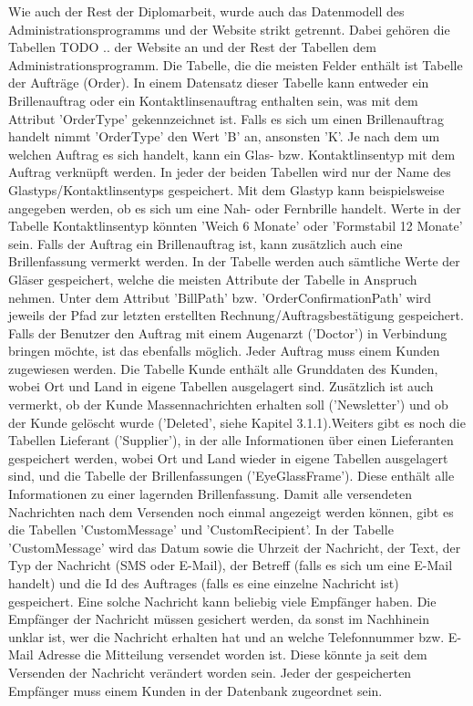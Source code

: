 Wie auch der Rest der Diplomarbeit, wurde auch das Datenmodell des Administrationsprogramms und der Website strikt getrennt. Dabei gehören die Tabellen TODO ..  der Website an und der Rest der Tabellen dem Administrationsprogramm. \newline Die Tabelle, die die meisten Felder enthält ist Tabelle der Aufträge (Order). In einem Datensatz dieser Tabelle kann entweder ein Brillenauftrag oder ein Kontaktlinsenauftrag enthalten sein,  was mit dem Attribut 'OrderType' gekennzeichnet ist. Falls es sich um einen Brillenauftrag handelt nimmt 'OrderType' den Wert 'B' an, ansonsten 'K'. Je nach dem um welchen Auftrag es sich handelt, kann ein Glas- bzw. Kontaktlinsentyp mit dem Auftrag verknüpft werden. In jeder der beiden Tabellen wird nur der Name des Glastyps/Kontaktlinsentyps gespeichert. Mit dem Glastyp kann beispielsweise angegeben werden, ob es sich um eine Nah- oder Fernbrille handelt. Werte in der Tabelle Kontaktlinsentyp könnten 'Weich 6 Monate' oder 'Formstabil 12 Monate' sein. \newline Falls der Auftrag ein Brillenauftrag ist, kann zusätzlich auch eine Brillenfassung vermerkt werden. In der Tabelle werden auch sämtliche Werte der Gläser gespeichert, welche die meisten Attribute der Tabelle in Anspruch nehmen. Unter dem Attribut 'BillPath' bzw. 'OrderConfirmationPath' wird jeweils der Pfad zur letzten erstellten Rechnung/Auftragsbestätigung gespeichert. Falls der Benutzer den Auftrag mit einem Augenarzt ('Doctor') in Verbindung bringen möchte, ist das ebenfalls möglich. \newline Jeder Auftrag muss einem Kunden zugewiesen werden. Die Tabelle Kunde enthält alle Grunddaten des Kunden, wobei Ort und Land in eigene Tabellen ausgelagert sind. Zusätzlich ist auch vermerkt, ob der Kunde Massennachrichten erhalten soll ('Newsletter') und ob der Kunde gelöscht wurde ('Deleted', siehe Kapitel 3.1.1).\newline Weiters gibt es noch die Tabellen Lieferant ('Supplier'), in der alle Informationen über einen Lieferanten gespeichert werden, wobei Ort und Land wieder in eigene Tabellen ausgelagert sind, und die Tabelle der Brillenfassungen ('EyeGlassFrame'). Diese enthält alle Informationen zu einer lagernden Brillenfassung. \newline Damit alle versendeten Nachrichten nach dem Versenden noch einmal angezeigt werden können, gibt es die Tabellen 'CustomMessage' und 'CustomRecipient'. In der Tabelle 'CustomMessage' wird das Datum sowie die Uhrzeit der Nachricht, der Text, der Typ der Nachricht (SMS oder E-Mail), der Betreff (falls es sich um eine E-Mail handelt) und die Id des Auftrages (falls es eine einzelne Nachricht ist) gespeichert. Eine solche Nachricht kann beliebig viele Empfänger haben. Die Empfänger der Nachricht müssen gesichert werden, da sonst im Nachhinein unklar ist, wer die Nachricht erhalten hat und an welche Telefonnummer bzw. E-Mail Adresse die Mitteilung versendet worden ist. Diese könnte ja seit dem Versenden der Nachricht verändert worden sein. Jeder der gespeicherten  Empfänger muss einem Kunden in der Datenbank zugeordnet sein.
